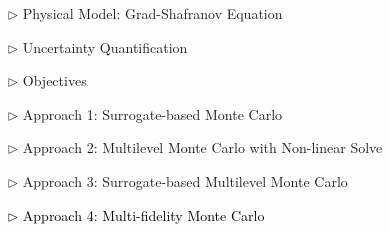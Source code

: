 \documentclass{beamer}
\begin{document}
\begin{frame}[c]
\large 	
\textcolor{mygray1}{
    \begin{itemize}[leftmargin=5pt] 
        \item[$\triangleright$]  Physical Model: Grad-Shafranov Equation
        \vspace{0.2cm}	
        \item[$\triangleright$] Uncertainty Quantification
        \vspace{0.2cm}
        \item[$\triangleright$]  Objectives
        \vspace{0.2cm}
        \item[$\triangleright$]  Approach 1: Surrogate-based Monte Carlo
        \vspace{0.2cm}
        \item[$\triangleright$] Approach 2: Multilevel Monte Carlo with Non-linear Solve
        \vspace{0.2cm}
        \item[$\triangleright$]  Approach 3: Surrogate-based Multilevel Monte Carlo
        \vspace{0.2cm}
        \item[\textcolor{black}{$\triangleright$}] \textcolor{black}{\fontsize{25}{60}\selectfont Approach 4: Multi-fidelity Monte Carlo}
    \end{itemize}
}
\end{frame}
\end{document}
